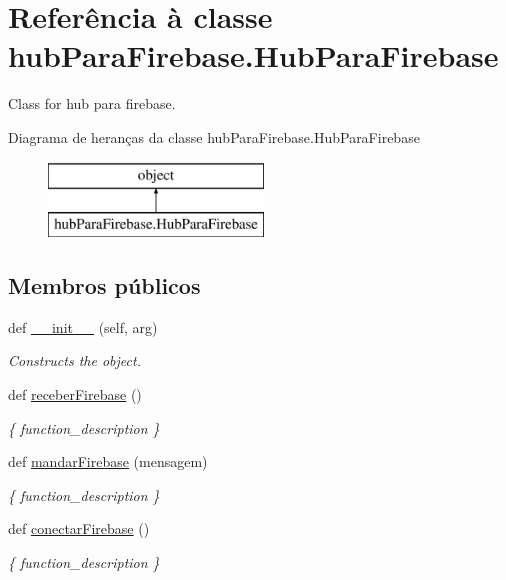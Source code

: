 \hypertarget{classhub_para_firebase_1_1_hub_para_firebase}{}\section{Referência à classe hub\+Para\+Firebase.\+Hub\+Para\+Firebase}
\label{classhub_para_firebase_1_1_hub_para_firebase}


Class for hub para firebase.  


Diagrama de heranças da classe hub\+Para\+Firebase.\+Hub\+Para\+Firebase\begin{figure}[H]
\begin{center}
\leavevmode
\includegraphics[height=2.000000cm]{classhub_para_firebase_1_1_hub_para_firebase}
\end{center}
\end{figure}
\subsection*{Membros públicos}
\begin{DoxyCompactItemize}
\item 
def \hyperlink{classhub_para_firebase_1_1_hub_para_firebase_a2125568a783092a9463703c03cbfe9d6}{\+\_\+\+\_\+init\+\_\+\+\_\+} (self, arg)
\begin{DoxyCompactList}\small\item\em Constructs the object. \end{DoxyCompactList}\item 
def \hyperlink{classhub_para_firebase_1_1_hub_para_firebase_adc3d6a4b1544ed5ae5caf1deb28cd296}{receber\+Firebase} ()
\begin{DoxyCompactList}\small\item\em \{ function\+\_\+description \} \end{DoxyCompactList}\item 
def \hyperlink{classhub_para_firebase_1_1_hub_para_firebase_a45da9f7fe0cd5f3feef0c44ae10523c1}{mandar\+Firebase} (mensagem)
\begin{DoxyCompactList}\small\item\em \{ function\+\_\+description \} \end{DoxyCompactList}\item 
def \hyperlink{classhub_para_firebase_1_1_hub_para_firebase_ad8ec2f4305787c63c27cab2822ddfd03}{conectar\+Firebase} ()
\begin{DoxyCompactList}\small\item\em \{ function\+\_\+description \} \end{DoxyCompactList}\end{DoxyCompactItemize}
